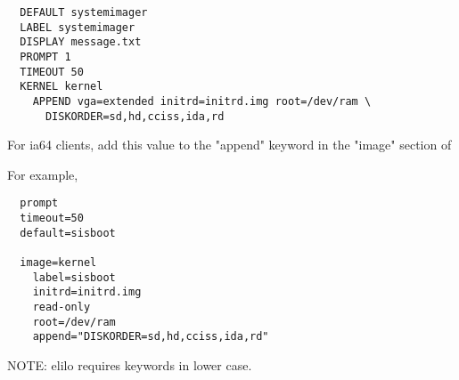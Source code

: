 \begin{itemize}
\begin{verbatim}
  DEFAULT systemimager
  LABEL systemimager
  DISPLAY message.txt
  PROMPT 1
  TIMEOUT 50
  KERNEL kernel
    APPEND vga=extended initrd=initrd.img root=/dev/ram \
      DISKORDER=sd,hd,cciss,ida,rd
\end{verbatim}

For ia64 clients, add this value to the "append" keyword in the "image"
section of


For example,

\begin{verbatim}
  prompt
  timeout=50
  default=sisboot

  image=kernel
    label=sisboot
    initrd=initrd.img
    read-only
    root=/dev/ram
    append="DISKORDER=sd,hd,cciss,ida,rd"
\end{verbatim}

NOTE: elilo requires keywords in lower case.

\end{itemize}

%
%
%
%
%
%
%
%

